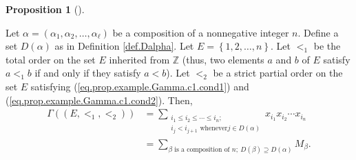\documentclass[numbers=enddot,12pt,final,onecolumn,notitlepage,abstracton]{scrartcl}
\theoremstyle{definition}
\newtheorem{prop}[theo]{Proposition}
\newenvironment{proposition}[1][]
{\begin{prop}[#1]\begin{leftbar}}
{\end{leftbar}\end{prop}}
\let\sumnonlimits\sum
\renewcommand{\sum}{\sumnonlimits\limits}
\newenvironment{verlong}{}{}
\begin{document}
\begin{verlong}
\begin{footnotesize}
\begin{proposition}
\label{prop.example.Gamma.c3}Let $\alpha=\left(  \alpha_{1},\alpha_{2}%
,\ldots,\alpha_{\ell}\right)  $ be a composition of a nonnegative integer $n$.
Define a set $D\left(  \alpha\right)  $ as in Definition \ref{def.Dalpha}. Let
$E=\left\{  1,2,\ldots,n\right\}  $. Let $<_{1}$ be the total order on the set
$E$ inherited from $\mathbb{Z}$ (thus, two elements $a$ and $b$ of $E$ satisfy
$a<_{1}b$ if and only if they satisfy $a<b$). Let $<_{2}$ be a strict partial
order on the set $E$ satisfying (\ref{eq.prop.example.Gamma.c1.cond1}) and
(\ref{eq.prop.example.Gamma.c1.cond2}). Then,%
\begin{align*}
\Gamma\left(  \left(  E,<_{1},<_{2}\right)  \right)   &  =\sum
_{\substack{i_{1}\leq i_{2}\leq\cdots\leq i_{n};\\i_{j}<i_{j+1}\text{ whenever
}j\in D\left(  \alpha\right)  }}x_{i_{1}}x_{i_{2}}\cdots x_{i_{n}}\\
&  =\sum_{\beta\text{ is a composition of }n;\ D\left(  \beta\right)
\supseteq D\left(  \alpha\right)  }M_{\beta}.
\end{align*}

\end{proposition}


\end{footnotesize}
\end{verlong}
\end{document}
